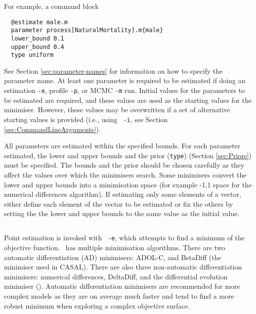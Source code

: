 For example, a  command block 

{\small{\begin{verbatim}
  @estimate male.m
  parameter process[NaturalMortality].m{male}
  lower_bound 0.1
  upper_bound 0.4
  type uniform
\end{verbatim}}}

See Section \ref{sec:parameter-names} for information on how to specify the parameter name. At least one parameter is required to be estimated if doing an estimation \texttt{-e}, profile \texttt{-p}, or MCMC \texttt{-m} run. Initial values for the parameters to be estimated are required, and these values are used as the starting values for the minimiser. However, these values may be overwritten if a set of alternative starting values is provided (i.e., using \texttt{\cname\ -i}, see Section \ref{sec:CommandLineArguments}).

All parameters are estimated within the specified bounds. For each parameter estimated, the lower and upper bounds and the prior (\texttt{type}) (Section \ref{sec:Priors}) must be specified. The bounds and the prior should be chosen carefully as they affect the values over which the minimisers search. Some minimisers convert the lower and upper bounds into a minimisation space (for example -1,1 space for the numerical differences algorithm). If estimating only some elements of a vector, either define each element of the vector to be estimated or fix the others by setting the the lower and upper bounds to the same value as the initial value.

\subsection{\label{sec:estimate-MPD}}\label{sec:Minimiser}

Point estimation is invoked with \texttt{\cname\ -e}, which attempts to find a minimum of the objective function. \CNAME\ has multiple minimisation algorithms. There are two automatic differentiation (AD) minimisers: ADOL-C, and BetaDiff (the minimiser used in CASAL). There are also three non-automatic differentiation minimisers: numerical differences, DeltaDiff, and the differential evolution minimiser (). Automatic differentiation  minimisers are recommended for more complex models as they are on average much faster and tend to find a more robust minimum when exploring a complex objective surface.


